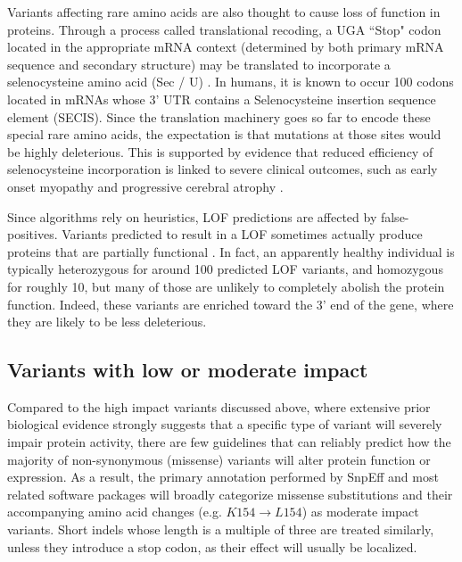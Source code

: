 Variants affecting rare amino acids are also thought to cause loss of function in proteins. 
Through a process called translational recoding, a UGA ``Stop" codon located in the appropriate mRNA context (determined by both primary mRNA sequence and secondary structure) may be translated to incorporate a selenocysteine amino acid (Sec / U) \cite{alberts1995molecular}. 
In humans, it is known to occur 100 codons located in mRNAs whose 3' UTR contains a Selenocysteine insertion sequence element (SECIS). 
Since the translation machinery goes so far to encode these special rare amino acids, the expectation is that mutations at those sites would be highly deleterious. 
This is supported by evidence that reduced efficiency of selenocysteine incorporation is linked to severe clinical outcomes, such as early onset myopathy  \cite{maiti2009mutation} and progressive cerebral atrophy  \cite{agamy2010mutations}.
	
Since algorithms rely on heuristics, LOF predictions are affected by false-positives. 
Variants predicted to result in a LOF sometimes actually produce proteins that are partially functional  \cite{macarthur2012systematic}. 
In fact, an apparently healthy individual is typically heterozygous for around 100 predicted LOF variants, and homozygous for roughly 10, but many of those are unlikely to completely abolish the protein function. 
Indeed, these variants are enriched toward the 3' end of the gene, where they are likely to be less deleterious. 

\subsection{Variants with low or moderate impact}

Compared to the high impact variants discussed above, where extensive prior biological evidence strongly suggests that a specific type of variant will severely impair protein activity, there are few guidelines that can reliably predict how the majority of non-synonymous (missense) variants will alter protein function or expression. As a result, the primary annotation performed by SnpEff and most related software packages will broadly categorize missense substitutions and their accompanying amino acid changes (e.g. $K154 \rightarrow L154$) as moderate impact variants. Short indels whose length is a multiple of three are treated similarly, unless they introduce a stop codon, as their effect will usually be localized.

